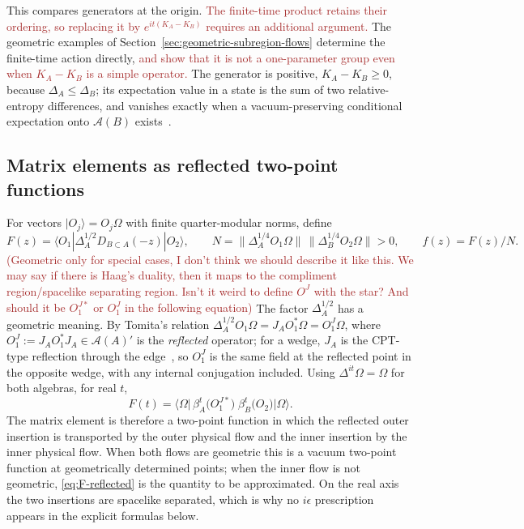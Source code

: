 \documentclass[a4paper,11pt]{article}
\theoremstyle{definition}
\newcommand{\KL}[1]{\textcolor{brown}{#1}}
\begin{document}
This compares generators at the origin. \KL{The finite-time product retains their ordering, so replacing it by $e^{it(K_A-K_B)}$ requires an additional argument.} The geometric examples of Section~\ref{sec:geometric-subregion-flows} determine the finite-time action directly, \KL{and show that it is not a one-parameter group even when $K_A-K_B$ is a simple operator.} The generator is positive, $K_A-K_B\ge0$, because $\Delta_A\le\Delta_B$; its expectation value in a state is the sum of two relative-entropy differences, and vanishes exactly when a vacuum-preserving conditional expectation onto $\mathcal A(B)$ exists~\cite{companion}.

\subsection{Matrix elements as reflected two-point functions}\label{subsec:matrix-elements}

For vectors $|O_j\rangle=O_j\Omega$ with finite quarter-modular norms, define
\begin{equation}
 F(z)=\langle O_1|\Delta_A^{1/2}D_{B\subset A}(-z)|O_2\rangle,
 \qquad
 N=\|\Delta_A^{1/4}O_1\Omega\|\,\|\Delta_B^{1/4}O_2\Omega\|>0,
 \qquad
 f(z)=F(z)/N.
 \label{eq:F-def}
\end{equation}
\KL{(Geometric only for special cases, I don't think we should describe it like this. We may say if there is Haag's duality, then it maps to the compliment region/spacelike separating region. Isn't it weird to define $O^J$ with the star? And should it be $O_1^{J*}$ or $O_1^{J}$ in the following equation)} The factor $\Delta_A^{1/2}$ has a geometric meaning. By Tomita's relation $\Delta_A^{1/2}O_1\Omega=J_AO_1^*\Omega=O_1^J\Omega$, where $O_1^J:=J_AO_1^*J_A\in\mathcal A(A)'$ is the \emph{reflected} operator; for a wedge, $J_A$ is the CPT-type reflection through the edge~\cite{bisognanowichmann}, so $O_1^J$ is the same field at the reflected point in the opposite wedge, with any internal conjugation included. Using $\Delta^{it}\Omega=\Omega$ for both algebras, for real $t$,
\begin{equation}
 F(t)=\big\langle\Omega\big|\,\beta_A^t\!\bigl(O_1^{J*}\bigr)\;\beta_B^t\!\bigl(O_2\bigr)\big|\Omega\big\rangle .
 \label{eq:F-reflected}
\end{equation}
The matrix element is therefore a two-point function in which the reflected outer insertion is transported by the outer physical flow and the inner insertion by the inner physical flow. When both flows are geometric this is a vacuum two-point function at geometrically determined points; when the inner flow is not geometric, \eqref{eq:F-reflected} is the quantity to be approximated. On the real axis the two insertions are spacelike separated, which is why no $i\epsilon$ prescription appears in the explicit formulas below.
\end{document}
